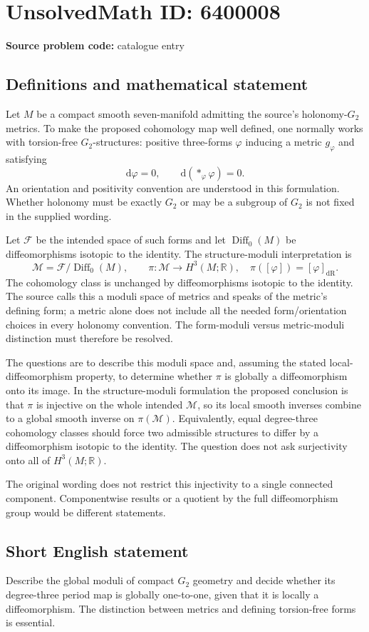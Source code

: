 \documentclass[11pt]{article}
\newcommand{\R}{\mathbb{R}}
\begin{document}
\section*{UnsolvedMath ID: 6400008}
\textbf{Source problem code:} catalogue entry
\subsection{Definitions and mathematical statement}
Let $M$ be a compact smooth seven-manifold admitting the source's holonomy-$G_2$ metrics. To make the proposed cohomology map well defined, one normally works with torsion-free $G_2$-structures: positive three-forms $\varphi$ inducing a metric $g_\varphi$ and satisfying
\[
 \mathrm d\varphi=0,\qquad
 \mathrm d(*_\varphi\varphi)=0.
\]
An orientation and positivity convention are understood in this formulation. Whether holonomy must be exactly $G_2$ or may be a subgroup of $G_2$ is not fixed in the supplied wording.

Let $\mathcal F$ be the intended space of such forms and let $\operatorname{Diff}_0(M)$ be diffeomorphisms isotopic to the identity. The structure-moduli interpretation is
\[
 \mathcal M=\mathcal F/\operatorname{Diff}_0(M),\qquad
 \pi:\mathcal M\to H^3(M;\R),\quad
 \pi([\varphi])=[\varphi]_{\mathrm{dR}}.
\]
The cohomology class is unchanged by diffeomorphisms isotopic to the identity. The source calls this a moduli space of metrics and speaks of the metric's defining form; a metric alone does not include all the needed form/orientation choices in every holonomy convention. The form-moduli versus metric-moduli distinction must therefore be resolved.

The questions are to describe this moduli space and, assuming the stated local-diffeomorphism property, to determine whether $\pi$ is globally a diffeomorphism onto its image. In the structure-moduli formulation the proposed conclusion is that $\pi$ is injective on the whole intended $\mathcal M$, so its local smooth inverses combine to a global smooth inverse on $\pi(\mathcal M)$. Equivalently, equal degree-three cohomology classes should force two admissible structures to differ by a diffeomorphism isotopic to the identity. The question does not ask surjectivity onto all of $H^3(M;\R)$.

The original wording does not restrict this injectivity to a single connected component. Componentwise results or a quotient by the full diffeomorphism group would be different statements.
\subsection{Short English statement}
Describe the global moduli of compact $G_2$ geometry and decide whether its degree-three period map is globally one-to-one, given that it is locally a diffeomorphism. The distinction between metrics and defining torsion-free forms is essential.
\end{document}
